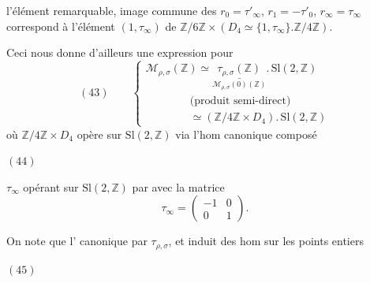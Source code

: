 
l'élément remarquable, image commune des $r_0=\tau'_\infty$, $r_1=-\tau'_0$, $r_\infty=\tau_\infty$ correspond à l'élément $(1,\tau_\infty)$ de $\mathbb Z/6\mathbb Z\times(D_4\simeq\{1,\tau_\infty\}.\mathbb Z/4\mathbb Z)$.

Ceci nous donne d'ailleurs une expression pour 
\[
(43)\qquad
\left\{
\begin{array}{l}
\mathcal M_{\rho,\sigma}(\mathbb Z)\simeq
\underset{\mathcal M_{\rho,\sigma}(0)(\mathbb Z)}{\underline{\tau_{\rho,\sigma}(\mathbb Z)}}
.\,\mathrm{Sl}(2,\mathbb Z)\\[5pt]
\hspace{4em}\text{(produit semi-direct)}\\[5pt]
\hspace{4em}\simeq(\mathbb Z/4\mathbb Z\times D_4).\,\mathrm{Sl}(2,\mathbb Z)
\end{array}\right.
\]
où $\mathbb Z/4\mathbb Z\times D_4$ opère sur $\mathrm{Sl}(2,\mathbb Z)$ via l'hom canonique composé

\begin{samepage}
\noindent$(44)$\quad
{}
\end{samepage}

$\tau_\infty$ opérant sur $\mathrm{Sl}(2,\mathbb Z)$ par  avec la matrice
\[
\tau_\infty=\begin{pmatrix}-1&0\\0&1\end{pmatrix}.
\]
\margin{!}

On note que l' canonique
 par  $\tau_{\rho,\sigma}$, et induit des hom sur les points entiers

\begin{samepage}
\noindent$(45)$\quad
{}
\end{samepage}

